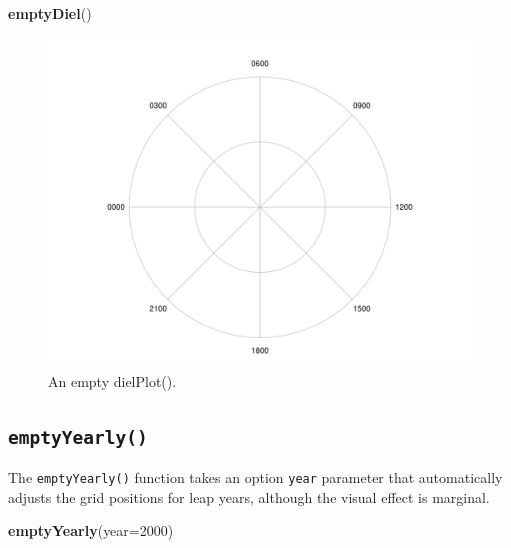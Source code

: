 \documentclass[
]{book}
\newenvironment{Shaded}{\begin{snugshade}}{\end{snugshade}}
\newcommand{\AttributeTok}[1]{\textcolor[rgb]{0.13,0.29,0.53}{#1}}
\newcommand{\DecValTok}[1]{\textcolor[rgb]{0.00,0.00,0.81}{#1}}
\newcommand{\FunctionTok}[1]{\textcolor[rgb]{0.13,0.29,0.53}{\textbf{#1}}}
\newcommand{\NormalTok}[1]{#1}
\begin{document}
\begin{Shaded}
\begin{Highlighting}[]
\FunctionTok{emptyDiel}\NormalTok{()}
\end{Highlighting}
\end{Shaded}

\begin{figure}

{\centering \includegraphics[width=0.9\linewidth]{_main_files/figure-latex/emptyDiel-1} 

}

\caption{An empty dielPlot().}\label{fig:emptyDiel}
\end{figure}

\hypertarget{emptyyearly}{%
\subsection{\texorpdfstring{\texttt{emptyYearly()}}{emptyYearly()}}\label{emptyyearly}}

The \texttt{emptyYearly()} function takes an option \texttt{year} parameter that automatically adjusts the grid positions for leap years, although the visual effect is marginal.

\begin{Shaded}
\begin{Highlighting}[]
\FunctionTok{emptyYearly}\NormalTok{(}\AttributeTok{year=}\DecValTok{2000}\NormalTok{)}
\end{Highlighting}
\end{Shaded}
\end{document}
